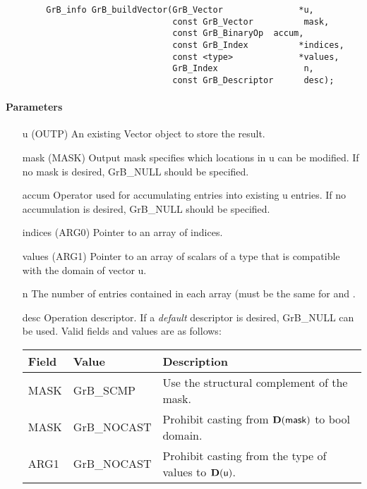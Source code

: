 \begin{verbatim}
        GrB_info GrB_buildVector(GrB_Vector               *u,
                                 const GrB_Vector          mask,
                                 const GrB_BinaryOp  accum,
                                 const GrB_Index          *indices,
                                 const <type>             *values,
                                 GrB_Index                 n,
                                 const GrB_Descriptor      desc);
\end{verbatim}

\paragraph{Parameters}

\begin{itemize}[leftmargin=1.1in]
        \item[{\sf u}]      ({\sf OUTP}) An existing Vector object to store the result.
        \item[{\sf mask}]   ({\sf MASK}) Output mask specifies which locations in
                        {\sf u} can be modified.  If no mask is desired,
                        {\sf GrB\_NULL} should be specified.
    \item[{\sf accum}]  Operator used for accumulating entries into existing
                        {\sf u} entries. If no accumulation is desired,
                        {\sf GrB\_NULL} should be specified.
    \item[{\sf indices}] ({\sf ARG0}) Pointer to an array of indices. 
    \item[{\sf values}] ({\sf ARG1}) Pointer to an array of scalars of a type that
                                     is compatible with the domain of vector {\sf u}.
        \item[{\sf n}]      The number of entries contained in each array (must be the same for  and .
        \item[{\sf desc}]   Operation descriptor. If a
    \emph{default} descriptor is desired, {\sf GrB\_NULL} can be
    used.  Valid fields and values are as follows: \\
        \begin{tabular}{lll}
            Field  & Value & Description \\
            \hline
            {\sf MASK} & {\sf GrB\_SCMP}   & Use the structural complement of the mask. \\
            {\sf MASK} & {\sf GrB\_NOCAST} & Prohibit casting from $\bold{D}({\sf mask})$ to {\sf bool} domain. \\
            {\sf ARG1} & {\sf GrB\_NOCAST} & Prohibit casting from the type of {\sf values} to $\bold{D}(\arg{u})$. \\
        \end{tabular}
\end{itemize}

